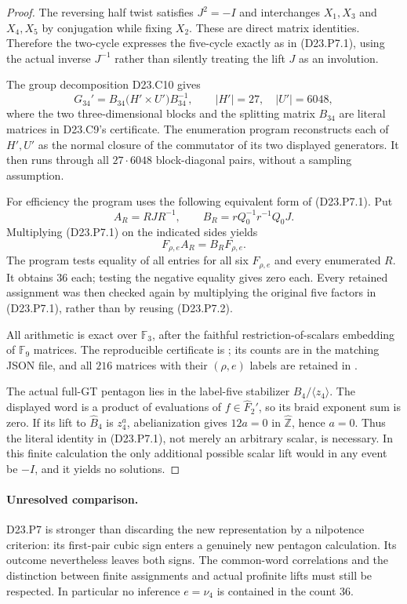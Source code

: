 \begin{proof}
The reversing half twist satisfies $J^2=-I$ and interchanges
$X_1,X_3$ and $X_4,X_5$ by conjugation while fixing $X_2$.
These are direct matrix identities. Therefore the two-cycle
expresses the five-cycle exactly as in (D23.P7.1), using the
actual inverse $J^{-1}$ rather than silently treating the lift
$J$ as an involution.

The group decomposition D23.C10 gives
\[
 G_{34}'=B_{34}\bigl(H'\times U'\bigr)B_{34}^{-1},
 \qquad |H'|=27,\quad |U'|=6048,
\]
where the two three-dimensional blocks and the splitting matrix
$B_{34}$ are literal matrices in D23.C9's certificate. The
enumeration program reconstructs each of $H',U'$ as the normal
closure of the commutator of its two displayed generators. It
then runs through all $27\cdot6048$ block-diagonal pairs, without
a sampling assumption.

For efficiency the program uses the following equivalent form of
(D23.P7.1). Put
\[
 A_R=RJR^{-1},\qquad
 B_R=rQ_0^{-1}r^{-1}Q_0J.
\]
Multiplying (D23.P7.1) on the indicated sides yields
\[
 F_{\rho,e}A_R=B_RF_{\rho,e}.
\tag{D23.P7.2}
\]
The program tests equality of all entries for all six $F_{\rho,e}$
and every enumerated $R$. It obtains $36$ each; testing the
negative equality gives zero each. Every retained assignment was
then checked again by multiplying the original five factors in
(D23.P7.1), rather than by reusing (D23.P7.2).

All arithmetic is exact over $\mathbb F_3$, after the faithful
restriction-of-scalars embedding of $\mathbb F_9$ matrices. The
reproducible certificate is
; its counts are
in the matching JSON file, and all $216$ matrices with their
$(\rho,e)$ labels are retained in
.

The actual full-GT pentagon lies in the label-five stabilizer
$B_4/\langle z_4\rangle$. The displayed word is a product of
evaluations of $f\in\widehat F_2'$, so its braid exponent sum is
zero. If its lift to $\widehat B_4$ is $z_4^a$, abelianization
gives $12a=0$ in $\widehat{\mathbb Z}$, hence $a=0$. Thus the
literal identity in (D23.P7.1), not merely an arbitrary scalar,
is necessary. In this finite calculation the only additional
possible scalar lift would in any event be $-I$, and it yields
no solutions.
\end{proof}

\paragraph{Unresolved comparison.}
D23.P7 is stronger than discarding the new representation by a
nilpotence criterion: its first-pair cubic sign enters a genuinely
new pentagon calculation. Its outcome nevertheless leaves both
signs. The common-word correlations and the distinction between
finite assignments and actual profinite lifts must still be
respected. In particular no inference $e=\nu_4$ is contained in
the count $36$.
